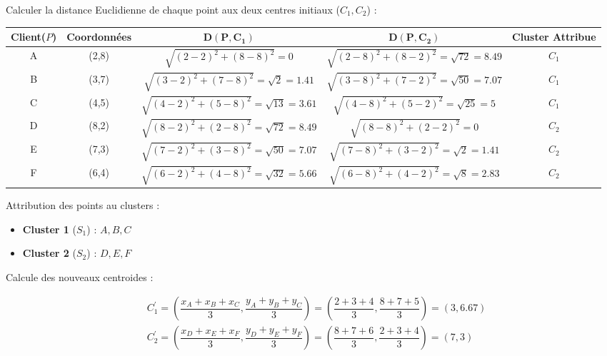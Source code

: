 \documentclass{article}
\begin{document}
\vspace{0.75cm}
Calculer la distance Euclidienne de chaque point aux deux centres initiaux ($C_1 , C_2$) :

\begin{table}[h]
\centering

\renewcommand{\arraystretch}{2.25} 
\setlength{\tabcolsep}{3pt}      

\begin{tabular}{|c|c|c|c|c|} 
\hline
\textbf{Client($P$)} & \textbf{Coordonnées} & $\mathbf{D(P,C_1)}$ & $\mathbf{D(P,C_2)}$ & Cluster Attribue  \\ \hline
A        & (2,8)          & $\sqrt{(2-2)^2 + (8-8)^2} = 0$  & $\sqrt{(2-8)^2 + (8-2)^2} = \sqrt{72} = 8.49$    & $C_1$  \\ \hline
B          & (3,7) & $\sqrt{(3-2)^2 + (7-8)^2} = \sqrt{2} = 1.41$  & $\sqrt{(3-8)^2 + (7-2)^2} = \sqrt{50} = 7.07$    & $C_1$  \\ \hline
C & (4,5) & $\sqrt{(4-2)^2 + (5-8)^2} = \sqrt{13} = 3.61$  & $\sqrt{(4-8)^2 + (5-2)^2} = \sqrt{25} = 5$    & $C_1$  \\ \hline
D        & (8,2)& $\sqrt{(8-2)^2 + (2-8)^2} = \sqrt{72} = 8.49$  & $\sqrt{(8-8)^2 + (2-2)^2} = 0$    & $C_2$  \\ \hline     
E          & (7,3)& $\sqrt{(7-2)^2 + (3-8)^2} = \sqrt{50} = 7.07$  & $\sqrt{(7-8)^2 + (3-2)^2} = \sqrt{2} = 1.41$    & $C_2$  \\ \hline           
F      & (6,4) & $\sqrt{(6-2)^2 + (4-8)^2} = \sqrt{32} = 5.66$  & $\sqrt{(6-8)^2 + (4-2)^2} = \sqrt{8} = 2.83$    & $C_2$  \\ \hline           

\end{tabular}
\end{table}

\vspace{0.75cm}

Attribution des points au clusters :
\begin{itemize}
    \setlength{\itemsep}{0pt}
    \item \textbf{Cluster 1} ($S_1$) : $A , B , C$
    \item \textbf{Cluster 2} ($S_2$) : $D , E , F $
\end{itemize}

\vspace{0.75cm}

Calcule des nouveaux centroides :

\begin{align*}
&C^{'}_1 = \left(\dfrac{x_A+x_B+x_C}{3} , \dfrac{y_A+y_B+y_C}{3} \right) = \left(\dfrac{2+3+4}{3} , \dfrac{8+7+5}{3} \right)  = (3,6.67)\\[0.15cm]
&C^{'}_2 = \left(\dfrac{x_D+x_E+x_F}{3} , \dfrac{y_D+y_E+y_F}{3} \right) = \left(\dfrac{8+7+6}{3} , \dfrac{2+3+4}{3} \right)  = (7,3)
\end{align*}
\end{document}
